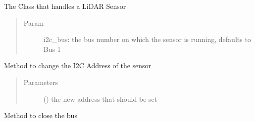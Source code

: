 \documentclass[letterpaper,10pt,english]{sphinxmanual}
\begin{document}

\begin{fulllineitems}
\label{\detokenize{sensor:lib.sensor.Sensor}}
The Class that handles a LiDAR Sensor
\begin{quote}\begin{description}
\item[{Param}] \leavevmode
i2c\_bus: the bus number on which the sensor is running, defaults to Bus 1

\end{description}\end{quote}

\begin{fulllineitems}
\label{\detokenize{sensor:lib.sensor.Sensor.change_addr}}
Method to change the I2C Address of the sensor
\begin{quote}\begin{description}
\item[{Parameters}] \leavevmode
{} () \textendash{} the new address that should be set

\end{description}\end{quote}

\end{fulllineitems}


\begin{fulllineitems}
\label{\detokenize{sensor:lib.sensor.Sensor.close}}
Method to close the bus

\end{fulllineitems}


\end{fulllineitems}
\end{document}
